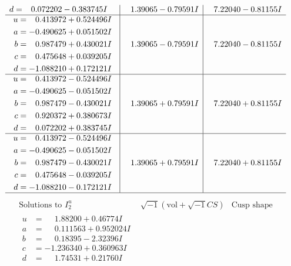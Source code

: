 \documentclass[1p]{elsarticle_modified}
\theoremstyle{definition}
\newcommand{\I}{\sqrt{-1}}
\begin{document}
$$\begin{array}{c|c|c}
\begin{aligned}
d &= \phantom{-}0.072202 - 0.383745 I\end{aligned}
 & \phantom{-}1.39065 - 0.79591 I & \phantom{-}7.22040 - 0.81155 I \\ \hline\begin{aligned}
u &= \phantom{-}0.413972 + 0.524496 I \\
a &= -0.490625 + 0.051502 I \\
b &= \phantom{-}0.987479 + 0.430021 I \\
c &= \phantom{-}0.475648 + 0.039205 I \\
d &= -1.088210 + 0.172121 I\end{aligned}
 & \phantom{-}1.39065 - 0.79591 I & \phantom{-}7.22040 - 0.81155 I \\ \hline\begin{aligned}
u &= \phantom{-}0.413972 - 0.524496 I \\
a &= -0.490625 - 0.051502 I \\
b &= \phantom{-}0.987479 - 0.430021 I \\
c &= \phantom{-}0.920372 + 0.380673 I \\
d &= \phantom{-}0.072202 + 0.383745 I\end{aligned}
 & \phantom{-}1.39065 + 0.79591 I & \phantom{-}7.22040 + 0.81155 I \\ \hline\begin{aligned}
u &= \phantom{-}0.413972 - 0.524496 I \\
a &= -0.490625 - 0.051502 I \\
b &= \phantom{-}0.987479 - 0.430021 I \\
c &= \phantom{-}0.475648 - 0.039205 I \\
d &= -1.088210 - 0.172121 I\end{aligned}
 & \phantom{-}1.39065 + 0.79591 I & \phantom{-}7.22040 + 0.81155 I\\
 \hline 
 \end{array}$$\newpage$$\begin{array}{c|c|c}  
\text{Solutions to }I^u_{2}& \I (\text{vol} + \sqrt{-1}CS) & \text{Cusp shape}\\
 \hline 
\begin{aligned}
u &= \phantom{-}1.88200 + 0.46774 I \\
a &= \phantom{-}0.111563 + 0.952024 I \\
b &= \phantom{-}0.18395 - 2.32396 I \\
c &= -1.236340 + 0.360963 I \\
d &= \phantom{-}1.74531 + 0.21760 I\end{aligned}

\end{array}$$
\end{document}
